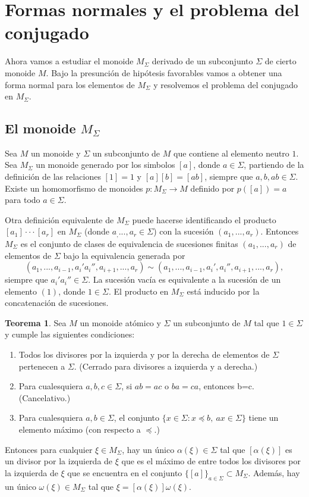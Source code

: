 \documentclass[12pt]{book}
\theoremstyle{definition}
\newtheorem{teor}{Teorema}[section]
\begin{document}
\section{Formas normales y el problema del conjugado}

Ahora vamos a estudiar el monoide $M_\Sigma$ derivado de un subconjunto $\Sigma$ de cierto monoide $M$. Bajo la presunción de hipótesis favorables vamos a obtener una forma normal para los elementos de $M_\Sigma$ y resolvemos el problema del conjugado en $M_\Sigma$.

\subsection{El monoide $M_\Sigma$} 

Sea $M$ un monoide y $\Sigma$ un subconjunto de $M$ que contiene al elemento neutro $1$. Sea $M_\Sigma$ un monoide generado por los simbolos $[a]$, donde $a\in \Sigma$, partiendo de la definición de las relaciones $[1]=1$ y $[a][b]=[ab]$, siempre que $a,b,ab\in\Sigma$. Existe un homomorfismo de monoides $p:M_\Sigma\rightarrow M$ definido por $p([a])=a$ para todo $a\in\Sigma$.

Otra definición equivalente de $M_\Sigma$ puede hacerse identificando el producto $[a_1]\cdot\cdot\cdot[a_r]$ en $M_\Sigma$ (donde $a_,...,a_r\in \Sigma$) con la sucesión $(a_1,...,a_r)$. Entonces $M_\Sigma$ es el conjunto de clases de equivalencia de sucesiones finitas $(a_1,...,a_r)$ de elementos de $\Sigma$ bajo la equivalencia generada por
$$(a_1,...,a_{i-1}, a_i'a_i'',a_{i+1},...,a_r)\sim (a_1,...,a_{i-1}, a_i',a_i'',a_{i+1},...,a_r),$$
siempre que $a_i'a_i''\in\Sigma$. La sucesión vacía es equivalente a la sucesión de un elemento $(1)$, donde $1\in\Sigma$. El producto en $M_\Sigma$ está inducido por la concatenación de sucesiones.


\begin{teor}
\label{teor:monoi_deriv}
Sea $M$ un monoide atómico y $\Sigma$ un subconjunto de $M$ tal que $1\in \Sigma$ y cumple las siguientes condiciones:
\begin{enumerate}
\item Todos los divisores por la izquierda y por la derecha de elementos de $\Sigma$ pertenecen a $\Sigma$. (Cerrado para divisores a izquierda y a derecha.)
\item Para cualesquiera $a,b,c\in \Sigma$, si $ab=ac$ o $ba=ca$, entonces b=c. (Cancelativo.)
\item Para cualesquiera $a,b\in \Sigma$, el conjunto $\{x\in\Sigma:x\preceq b,\ ax\in\Sigma\}$ tiene un elemento máximo (con respecto a $\preceq$.)
\end{enumerate}
Entonces para cualquier $\xi\in M_\Sigma$, hay un único $\alpha(\xi)\in\Sigma$ tal que $[\alpha(\xi)]$ es un divisor por la izquierda de $\xi$ que es el máximo de entre todos los divisores por la izquierda de $\xi$ que se encuentra en el conjunto $\{[a]\}_{a\in\Sigma}\subset M_\Sigma$. Además, hay un único $\omega(\xi)\in M_\Sigma$ tal que $\xi=[\alpha(\xi)]\omega(\xi)$.
\end{teor}
\end{document}

